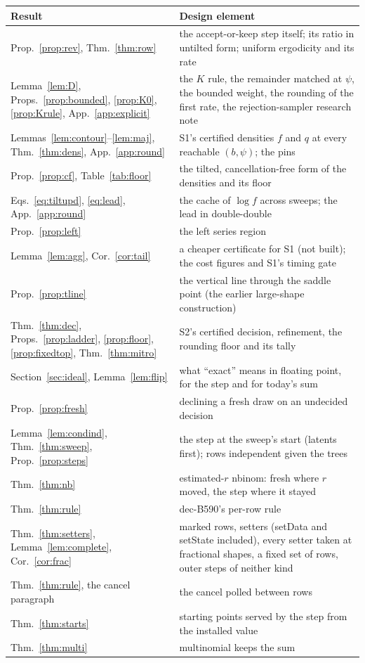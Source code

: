 \begin{center}\small
\begin{tabular}{>{\raggedright\arraybackslash}p{}>{\raggedright\arraybackslash}p{}}\toprule
Result & Design element\\\midrule
Prop.~\ref{prop:rev}, Thm.~\ref{thm:row} & the accept-or-keep step itself; its ratio in untilted form; uniform
ergodicity and its rate\\
Lemma~\ref{lem:D}, Props.~\ref{prop:bounded}, \ref{prop:K0}, \ref{prop:Krule}, App.~\ref{app:explicit} & the $K$
rule, the remainder matched at $\psi$, the bounded weight, the rounding of the first rate, the rejection-sampler
research note\\
Lemmas~\ref{lem:contour}--\ref{lem:maj}, Thm.~\ref{thm:dens}, App.~\ref{app:round} & S1's certified densities $f$
and $q$ at every reachable $(b,\psi)$; the pins\\
Prop.~\ref{prop:cf}, Table~\ref{tab:floor} & the tilted, cancellation-free form of the densities and its floor\\
Eqs.~\eqref{eq:tiltupd}, \eqref{eq:lead}, App.~\ref{app:round} & the cache of $\log f$ across sweeps; the lead in
double-double\\
Prop.~\ref{prop:left} & the left series region\\
Lemma~\ref{lem:agg}, Cor.~\ref{cor:tail} & a cheaper certificate for S1 (not built); the cost figures and S1's
timing gate\\
Prop.~\ref{prop:tline} & the vertical line through the saddle point (the earlier large-shape construction)\\
Thm.~\ref{thm:dec}, Props.~\ref{prop:ladder}, \ref{prop:floor}, \ref{prop:fixedtop}, Thm.~\ref{thm:mitro} & S2's
certified decision, refinement, the rounding floor and its tally\\
Section~\ref{sec:ideal}, Lemma~\ref{lem:flip} & what ``exact'' means in floating point, for the step and for
today's sum\\
Prop.~\ref{prop:fresh} & declining a fresh draw on an undecided decision\\
Lemma~\ref{lem:condind}, Thm.~\ref{thm:sweep}, Prop.~\ref{prop:steps} & the step at the sweep's start (latents
first); rows independent given the trees\\
Thm.~\ref{thm:nb} & estimated-$r$ nbinom: fresh where $r$ moved, the step where it stayed\\
Thm.~\ref{thm:rule} & dec-B590's per-row rule\\
Thm.~\ref{thm:setters}, Lemma~\ref{lem:complete}, Cor.~\ref{cor:frac} & marked rows, setters (setData and
setState included), every setter taken at fractional shapes, a fixed set of rows, outer steps of neither kind\\
Thm.~\ref{thm:rule}, the cancel paragraph & the cancel polled between rows\\
Thm.~\ref{thm:starts} & starting points served by the step from the installed value\\
Thm.~\ref{thm:multi} & multinomial keeps the sum\\\bottomrule
\end{tabular}
\end{center}

